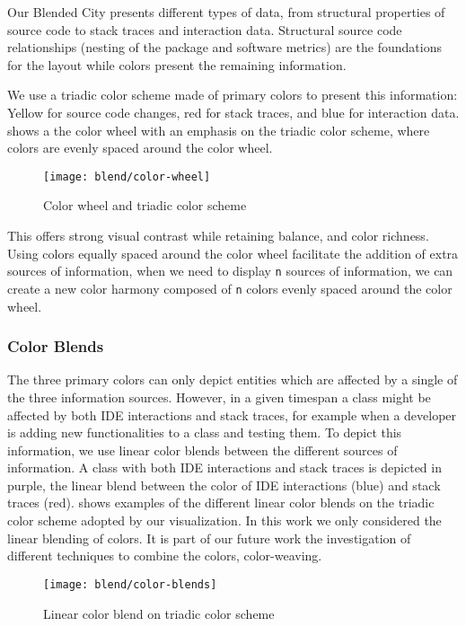 Our Blended City presents different types of data, from structural properties of source code to stack traces and interaction data.
Structural source code relationships (\ie nesting of the package and software metrics) are the foundations for the layout while colors present the remaining information.

We use a triadic color scheme made of primary colors to present this information: Yellow for source code changes, red for stack traces, and blue for interaction data.
 shows a the color wheel with an emphasis on the triadic color scheme, where colors are evenly spaced around the color wheel.

\begin{figure}[ht]
\centering
\texttt{[image: blend/color-wheel]}
\caption{Color wheel and triadic color scheme}
\label{fig:color-wheel}
\end{figure}

This offers strong visual contrast while retaining balance, and color richness.
Using colors equally spaced around the color wheel facilitate the addition of extra sources of information, \ie when we need to display \texttt{n} sources of information, we can create a new color harmony composed of \texttt{n} colors evenly spaced around the color wheel.


\subsubsection{Color Blends}

The three primary colors can only depict entities which are affected by a single of the three information sources.
However, in a given timespan a class might be affected by both IDE interactions and stack traces, for example when a developer is adding new functionalities to a class and testing them.
To depict this information, we use linear color blends between the different sources of information.
A class with both IDE interactions and stack traces is depicted in purple, the linear blend between the color of IDE interactions (\ie blue) and stack traces (\ie red).
 shows examples of the different linear color blends on the triadic color scheme adopted by our visualization.
In this work we only considered the linear blending of colors.
It is part of our future work the investigation of different techniques to combine the colors, \ie color-weaving.

\begin{figure}[ht]
\centering
\texttt{[image: blend/color-blends]}
\caption{Linear color blend on triadic color scheme}
\label{fig:color-blends}
\end{figure}


